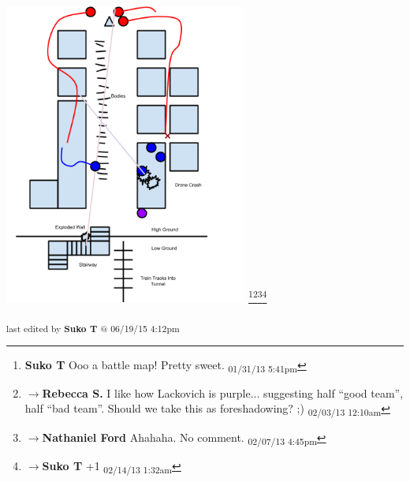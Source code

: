 \includegraphics[width=8cm]{img/ch15_battle_map.png}
\footnote{\textbf{Suko T }Ooo a battle map!  Pretty sweet. \textsubscript{01/31/13 5:41pm}}\footnote{$\rightarrow$\textbf{Rebecca S. }I like how Lackovich is purple... suggesting half ``good team'', half ``bad team''.  Should we take this as foreshadowing? ;) \textsubscript{02/03/13 12:10am}}\footnote{$\rightarrow$\textbf{Nathaniel Ford }Ahahaha. No comment. \textsubscript{02/07/13 4:45pm}}\footnote{$\rightarrow$\textbf{Suko T }+1 \textsubscript{02/14/13 1:32am}}



\vspace{\fill}

\begin{flushright}
\textsubscript{last edited by \textbf{Suko T} @ 06/19/15 4:12pm}
\end{flushright}


